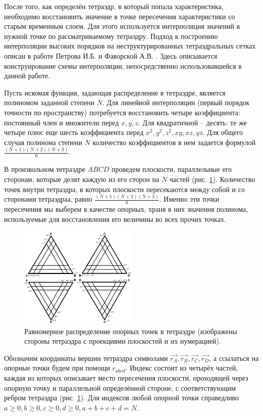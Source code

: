 После того, как определён тетраэдр, в который попала характеристика, необходимо восстановить значение в точке пересечения характеристики со старым временным слоем. Для этого используется интерполяция значений в нужной точке по рассматриваемому тетраэдру. Подход к построению интерполяции высоких порядков на неструктурированных тетраэдральных сетках описан в работе Петрова И.Б. и Фаворской А.В. \cite{interpolation_3d}. Здесь описывается конструирование схемы интерполяции, непосредственно использовавшейся в данной работе.

Пусть искомая функция, задающая распределение в тетраэдре, является полиномом заданной степени $N$. Для линейной интерполяции (первый порядок точности по пространству) потребуется восстановить четыре коэффициента: постоянный член и множители перед $x, y, z$. Для квадратичной -- десять: те же четыре плюс еще шесть коэффициента перед $x^2, y^2, z^2, xy, xz, yz$. Для общего случая полинома степени $N$ количество коэффициентов в нем задается формулой $\frac{(N+1)(N+2)(N+3)}{6}$.

В произвольном тетраэдре $ABCD$ проведем плоскости, параллельные его сторонам, которые делят каждую из его сторон на $N$ частей (рис. \ref{pic:tetr-interpolation-base-points}). Количество точек внутри тетраэдра, в которых плоскости пересекаются между собой и со сторонами тетраэдраа, равно $\frac{(N+1)(N+2)(N+3)}{6}$. Именно эти точки пересечения мы выберем в качестве опорных, храня в них значения полинома, используемые для восстановления его величины во всех прочих точках.

\begin{figure}[h]
\centering
\includegraphics[width=0.5\textwidth]{png/tetr-interpolation-base-points.png}
\caption{Равномерное распределение опорных точек в тетраэдре (изображены стороны тетраэдра с проекциями плоскостей и их нумерацией).}
\label{pic:tetr-interpolation-base-points}
\end{figure}

Обозначим координаты вершин тетраэдра символами $\vec{r_A}, \vec{r_B}, \vec{r_C}, \vec{r_D}$, а ссылаться на опорные точки будем при помощи $r_{abcd}$. Индекс состоит из четырёх частей, каждая из которых описывает место пересечения плоскости, проходящей через опорную точку и параллельной определённой стороне, с соответствующим ребром тетраэдра (рис. \ref{pic:tetr-interpolation-base-points}). Для индексов любой опорной точки справедливо $a \ge 0, b \ge 0, c \ge 0, d \ge 0, a+b+c+d = N$.


